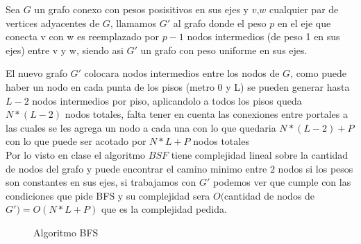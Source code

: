     Sea $G$ un grafo conexo con pesos posisitivos en sus ejes y $v$,$w$ cualquier par de vertices adyacentes de $G$, llamamos $G'$ al grafo donde el peso $p$ en el eje que conecta v con w es reemplazado por $p - 1$ nodos intermedios (de peso 1 en sus ejes) entre v y w, siendo asi $G'$ un grafo con peso uniforme en sus ejes. \\

    \begin{center}
        
    \end{center}
    
    El nuevo grafo $G'$ colocara nodos intermedios entre los nodos de $G$, como puede haber un nodo en cada punta de los pisos (metro 0 y L) se pueden generar hasta $L-2$ nodos intermedios por piso, aplicandolo a todos los pisos queda $N * (L - 2)$ nodos totales, falta tener en cuenta las conexiones entre portales a las cuales se les agrega un nodo a cada una con lo que quedaria $N * (L - 2) + P$ con lo que puede ser acotado por $N*L + P$ nodos totales \endl\\
    
    Por lo visto en clase el algoritmo $BSF$ tiene complejidad lineal sobre la cantidad de nodos del grafo y puede encontrar el camino minimo entre $2$ nodos si los pesos son constantes en sus ejes, si trabajamos con $G'$ podemos ver que cumple con las condiciones que pide BFS y su complejidad sera $O($cantidad de nodos de $G') = O(N*L + P)$ que es la complejidad pedida.
    
    \begin{figure}
    \centering
    
    \caption{Algoritmo BFS}
    \label{fig:my_label}
    \end{figure}
    
    \pagebreak

